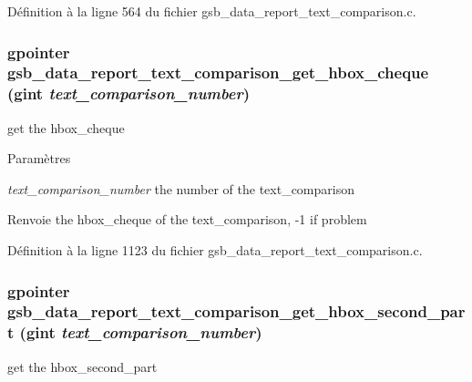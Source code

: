 Définition à la ligne 564 du fichier gsb\_\-data\_\-report\_\-text\_\-comparison.c.

\subsubsection[{gsb\_\-data\_\-report\_\-text\_\-comparison\_\-get\_\-hbox\_\-cheque}]{\setlength{\rightskip}{0pt plus 5cm}gpointer gsb\_\-data\_\-report\_\-text\_\-comparison\_\-get\_\-hbox\_\-cheque (gint {\em text\_\-comparison\_\-number})}\label{gsb__data__report__text__comparison_8c_aa0a5801ae659805b7d921d4da80d42d0}
get the hbox\_\-cheque


\begin{DoxyParams}{Paramètres}
\item[{\em text\_\-comparison\_\-number}]the number of the text\_\-comparison\end{DoxyParams}
\begin{DoxyReturn}{Renvoie}
the hbox\_\-cheque of the text\_\-comparison, -\/1 if problem 
\end{DoxyReturn}


Définition à la ligne 1123 du fichier gsb\_\-data\_\-report\_\-text\_\-comparison.c.

\subsubsection[{gsb\_\-data\_\-report\_\-text\_\-comparison\_\-get\_\-hbox\_\-second\_\-part}]{\setlength{\rightskip}{0pt plus 5cm}gpointer gsb\_\-data\_\-report\_\-text\_\-comparison\_\-get\_\-hbox\_\-second\_\-part (gint {\em text\_\-comparison\_\-number})}\label{gsb__data__report__text__comparison_8c_a43508d76f884118227a69a74796f653d}
get the hbox\_\-second\_\-part


